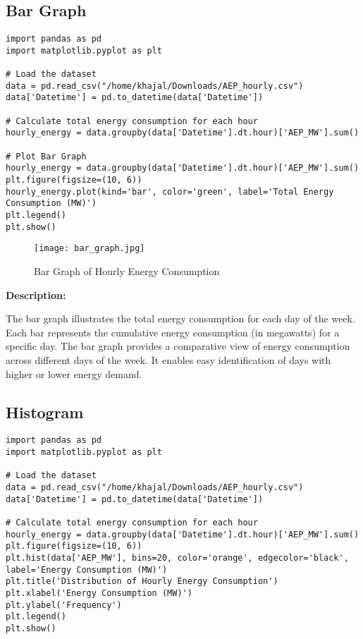 \documentclass{article}
\begin{document}
\subsection{ Bar Graph}
\begin{lstlisting}[caption={Python code for Bar Graph}]
import pandas as pd
import matplotlib.pyplot as plt

# Load the dataset
data = pd.read_csv("/home/khajal/Downloads/AEP_hourly.csv")
data['Datetime'] = pd.to_datetime(data['Datetime'])

# Calculate total energy consumption for each hour
hourly_energy = data.groupby(data['Datetime'].dt.hour)['AEP_MW'].sum()

# Plot Bar Graph
hourly_energy = data.groupby(data['Datetime'].dt.hour)['AEP_MW'].sum()
plt.figure(figsize=(10, 6))
hourly_energy.plot(kind='bar', color='green', label='Total Energy Consumption (MW)')
plt.legend()
plt.show()
\end{lstlisting}

\begin{figure}[H]
    \centering
    \texttt{[image: bar\_graph.jpg]}
    \caption{Bar Graph of Hourly Energy Consumption}
    \label{fig:Bar Graph}
\end{figure}
\textbf{Description:}

The bar graph illustrates the total energy consumption for each day of the week. Each bar represents the cumulative energy consumption (in megawatts) for a specific day.
The bar graph provides a comparative view of energy consumption across different days of the week. It enables easy identification of days with higher or lower energy demand.
\subsection{Histogram}
\begin{lstlisting}[caption={Python code for Histogram}]
import pandas as pd
import matplotlib.pyplot as plt

# Load the dataset
data = pd.read_csv("/home/khajal/Downloads/AEP_hourly.csv")
data['Datetime'] = pd.to_datetime(data['Datetime'])

# Calculate total energy consumption for each hour
hourly_energy = data.groupby(data['Datetime'].dt.hour)['AEP_MW'].sum()
plt.figure(figsize=(10, 6))
plt.hist(data['AEP_MW'], bins=20, color='orange', edgecolor='black', label='Energy Consumption (MW)')
plt.title('Distribution of Hourly Energy Consumption')
plt.xlabel('Energy Consumption (MW)')
plt.ylabel('Frequency')
plt.legend()
plt.show()
\end{lstlisting}
\end{document}
